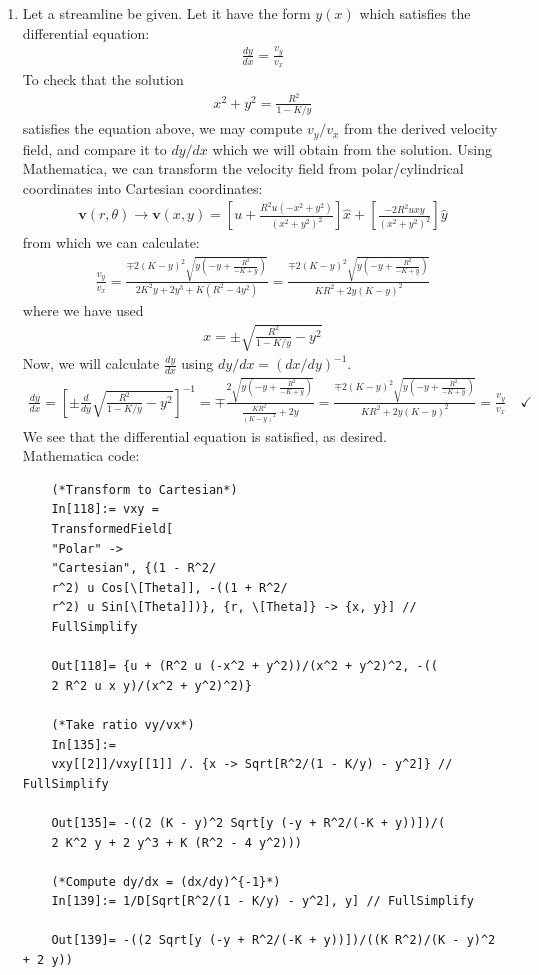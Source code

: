 \documentclass{article}
\theoremstyle{definition}
\newcommand{\f}[2]{\frac{#1}{#2}}
\newcommand{\lb}{\left[}
\newcommand{\rb}{\right]}
\begin{document}
\begin{enumerate}[label=(\alph*)]
	\item Let a streamline be given. Let it have the form $y(x)$ which satisfies the differential equation:
	\begin{align*}
	\f{dy}{dx} = \f{v_y}{v_x}
	\end{align*}
	To check that the solution 
	\begin{align*}
	x^2 + y^2 = \f{R^2}{1 - K/y}
	\end{align*}
	satisfies the equation above, we may compute $v_y/v_x$ from the derived velocity field, and compare it to $dy/dx$ which we will obtain from the solution. Using Mathematica, we can transform the velocity field from polar/cylindrical coordinates into Cartesian coordinates:
	\begin{align*}
	\mathbf{v}(r,\theta) \to \mathbf{v}(x,y) = \lb u + \f{R^2 u (-x^2 + y^2)}{(x^2 + y^2 )^2} \rb \hat{x} + \lb \f{-2R^2 u xy}{(x^2 + y^2)^2} \rb  \hat{y}
	\end{align*}	
	from which we can calculate:
	\begin{align*}
	\f{v_y}{v_x} = \f{\mp 2(K-y)^2 \sqrt{y(-y+\f{R^2}{-K+y})}}{2 K^2 y + 2y^3 + K(R^2 - 4y^2)} = \f{\mp 2(K-y)^2 \sqrt{y(-y+\f{R^2}{-K+y})}}{KR^2 + 2y(K-y)^2}
	\end{align*}
	where we have used
	\begin{align*}
	x = \pm \sqrt {\f{R^2}{1-K/y} - y^2}
	\end{align*}
	Now, we will calculate $\f{dy}{dx}$ using  $dy/dx = (dx/dy)^{-1}$. 
	\begin{align*}
	\f{dy}{dx} = \lb \pm \f{d}{dy}  \sqrt {\f{R^2}{1-K/y} - y^2} \rb^{-1} = \mp \f{2\sqrt{y(-y + \f{R^2}{-K+y})}}{\f{KR^2}{(K-y)^2} + 2y} =  \f{\mp 2(K-y)^2 \sqrt{y(-y + \f{R^2}{-K+y})}}{KR^2  + 2y(K-y)^2} = \f{v_y}{v_x} \quad \checkmark
	\end{align*}
	We see that the differential equation is satisfied, as desired. \\
	
	
	Mathematica code:
	\begin{lstlisting}
	(*Transform to Cartesian*)
	In[118]:= vxy = 
	TransformedField[
	"Polar" -> 
	"Cartesian", {(1 - R^2/
	r^2) u Cos[\[Theta]], -((1 + R^2/
	r^2) u Sin[\[Theta]])}, {r, \[Theta]} -> {x, y}] // 
	FullSimplify
	
	Out[118]= {u + (R^2 u (-x^2 + y^2))/(x^2 + y^2)^2, -((
	2 R^2 u x y)/(x^2 + y^2)^2)}
	
	(*Take ratio vy/vx*)
	In[135]:= 
	vxy[[2]]/vxy[[1]] /. {x -> Sqrt[R^2/(1 - K/y) - y^2]} // FullSimplify
	
	Out[135]= -((2 (K - y)^2 Sqrt[y (-y + R^2/(-K + y))])/(
	2 K^2 y + 2 y^3 + K (R^2 - 4 y^2)))
	
	(*Compute dy/dx = (dx/dy)^{-1}*)
	In[139]:= 1/D[Sqrt[R^2/(1 - K/y) - y^2], y] // FullSimplify
	
	Out[139]= -((2 Sqrt[y (-y + R^2/(-K + y))])/((K R^2)/(K - y)^2 + 2 y))
	\end{lstlisting}
\end{enumerate}
\end{document}
